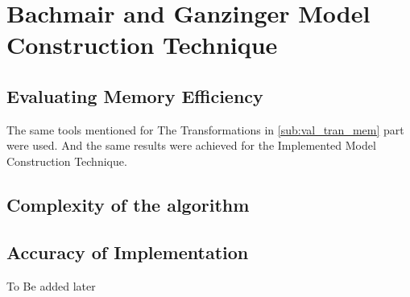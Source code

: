 \section{Bachmair and Ganzinger Model Construction Technique}
\subsection{Evaluating Memory Efficiency}
The same tools mentioned for The Transformations in \ref{sub:val_tran_mem} part were used. And the same results were achieved for the Implemented Model Construction Technique.



\subsection{Complexity of the algorithm}



\subsection{Accuracy of Implementation}
To Be added later 